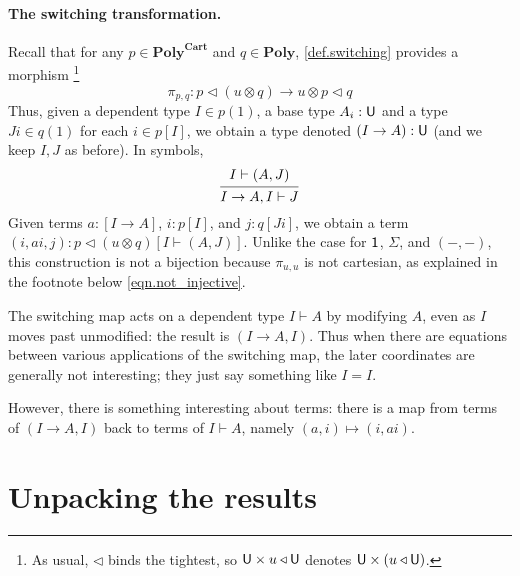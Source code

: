 \documentclass[11pt, one side, article]{memoir}
\theoremstyle{definition}
\theoremstyle{plain}
\newenvironment{remark}
  {\pushQED{\qed}\renewcommand{\qedsymbol}{$\lozenge$}\remarkx}
  {\popQED\endremarkx}
\newcommand{\Cat}[1]{\mathbf{#1}}%
\newcommand{\tn}[1]{\textnormal{#1}}
\newcommand{\poly}{\Cat{Poly}}
\newcommand{\polycart}{\poly^{\Cat{Cart}}}
\newcommand{\0}{\textsf{0}}
\newcommand{\1}{\tn{\textsf{1}}}
\newcommand{\U}{\tn{\textsf{U}}}
\newcommand{\tri}{\mathbin{\triangleleft}}
\newcommand{\switch}{\pi}
\begin{document}
\paragraph{The switching transformation.}

Recall that for any $p\in\polycart$ and $q\in\poly$, \cref{def.switching} provides a morphism%
\footnote{As usual, $\tri$ binds the tightest, so $\U\times u\tri \U$ denotes $\U\times(u\tri \U)$.}
\[\switch_{p,q}\colon p\tri (u\otimes q)\to u\otimes p\tri q\]
Thus, given a dependent type $I\in p(1)$, a base type $A_i:\U$ and a type $J i\in q(1)$ for each $i\in p[I]$, we obtain a type denoted $(I\to A):\U$ (and we keep $I,J$ as before). In symbols,
\begin{equation*}
  \begin{prooftree}
    \Hypo{I\vdash (A, J)}
    \Infer1{I\to A, I\vdash J}
  \end{prooftree}
\end{equation*}
Given terms $a:[I\to A]$, $i:p[I]$, and $j:q[Ji]$, we obtain a term $(i,a i, j):p\tri(u\otimes q)[I\vdash (A,J)]$. Unlike the case for $\1$, $\Sigma$, and $(-,-)$, this construction is not a bijection because $\switch_{u,u}$ is not cartesian, as explained in the footnote below \cref{eqn.not_injective}.

\begin{remark}\label{rem.switching_later_coords_irrel}
The switching map acts on a dependent type $I\vdash A$ by modifying $A$, even as $I$ moves past unmodified: the result is $(I\to A, I)$. Thus when there are equations between various applications of the switching map, the later coordinates are generally not interesting; they just say something like $I=I$.

However, there is something interesting about terms: there is a map from terms of $(I\to A,I)$ back to terms of $I\vdash A$, namely $(a,i)\mapsto(i,ai)$.
\end{remark}

\section{Unpacking the results}
\end{document}
